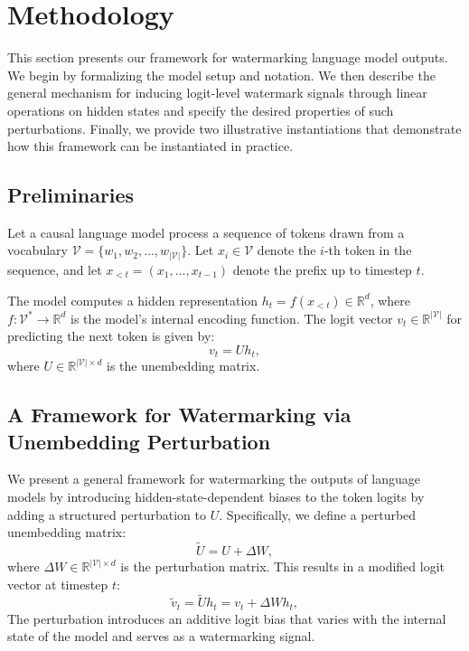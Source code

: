 \section{Methodology}
\label{sec:methodology}

This section presents our framework for watermarking language model outputs. We begin by formalizing the model setup and notation. We then describe the general mechanism for inducing logit-level watermark signals through linear operations on hidden states and specify the desired properties of such perturbations. Finally, we provide two illustrative instantiations that demonstrate how this framework can be instantiated in practice.

\subsection{Preliminaries}

Let a causal language model process a sequence of tokens drawn from a vocabulary \( \mathcal{V} = \{w_1, w_2, \dots, w_{|\mathcal{V}|}\} \). Let \( x_i \in \mathcal{V} \) denote the \( i \)-th token in the sequence, and let \( x_{<t} = (x_1, \dots, x_{t-1}) \) denote the prefix up to timestep \( t \).

The model computes a hidden representation \( h_t = f(x_{<t}) \in \mathbb{R}^d \), where \( f: \mathcal{V}^* \rightarrow \mathbb{R}^d \) is the model's internal encoding function. The logit vector \( v_t \in \mathbb{R}^{|\mathcal{V}|} \) for predicting the next token is given by:
\begin{equation}
    v_t = U h_t,
\end{equation}
where \( U \in \mathbb{R}^{|\mathcal{V}| \times d} \) is the unembedding matrix.

\subsection{A Framework for Watermarking via Unembedding Perturbation}

We present a general framework for watermarking the outputs of language models by introducing hidden-state-dependent biases to the token logits by adding a structured perturbation to \( U \). Specifically, we define a perturbed unembedding matrix:
\begin{equation}
    \tilde{U} = U + \Delta W,
\end{equation}
where \( \Delta W \in \mathbb{R}^{|\mathcal{V}| \times d} \) is the perturbation matrix. This results in a modified logit vector at timestep \( t \):
\begin{equation}
    \tilde{v}_t = \tilde{U} h_t = v_t + \Delta W h_t,
\end{equation}
The perturbation introduces an additive logit bias that varies with the internal state of the model and serves as a watermarking signal.


